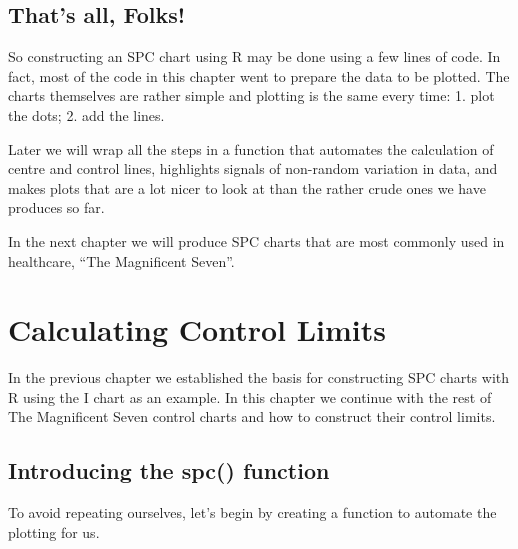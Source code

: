 \documentclass[
]{book}
\begin{document}
\section{That's all, Folks!}\label{thats-all-folks}

So constructing an SPC chart using R may be done using a few lines of code. In fact, most of the code in this chapter went to prepare the data to be plotted. The charts themselves are rather simple and plotting is the same every time: 1. plot the dots; 2. add the lines.

Later we will wrap all the steps in a function that automates the calculation of centre and control lines, highlights signals of non-random variation in data, and makes plots that are a lot nicer to look at than the rather crude ones we have produces so far.

In the next chapter we will produce SPC charts that are most commonly used in healthcare, ``The Magnificent Seven''.

\chapter{Calculating Control Limits}\label{limits}

In the previous chapter we established the basis for constructing SPC charts with R using the I chart as an example. In this chapter we continue with the rest of The Magnificent Seven control charts and how to construct their control limits.

\section{Introducing the spc() function}\label{introducing-the-spc-function}

To avoid repeating ourselves, let's begin by creating a function to automate the plotting for us.
\end{document}
